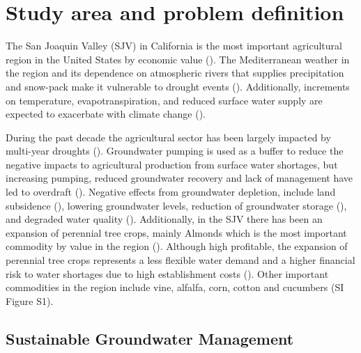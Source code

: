 \documentclass[11pt,a4paper]{article}
\begin{document}
\section{Study area and problem definition}

The San Joaquin Valley (SJV) in California is the most important agricultural region in the United States by economic value (\cite{usda_national_2020}). The Mediterranean weather in the region and its dependence on atmospheric rivers that supplies precipitation and snow-pack make it vulnerable to drought events (\cite{espinoza_global_2018}). Additionally, increments on temperature, evapotranspiration, and reduced surface water supply are expected to exacerbate with climate change (\cite{fernandez-bou_regional_2021}).

During the past decade the agricultural sector has been largely impacted by multi-year droughts (\cite{lund_lessons_2018,medellin-azuara_economic_2022}). Groundwater pumping is used as a buffer to reduce the negative impacts to agricultural production from surface water shortages, but increasing pumping, reduced groundwater recovery and lack of management have led to overdraft  (\cite{liu_groundwater_2022}). Negative effects from groundwater depletion, include land subsidence (\cite{ojha_sustained_2018}), lowering groundwater levels, reduction of groundwater storage (\cite{alam_post-drought_2021}), and degraded water quality (\cite{levy_critical_2021}). Additionally, in the SJV there has been an expansion of perennial tree crops, mainly Almonds which is the most important commodity by value  in the region (\cite{usda_national_2020}). Although high profitable, the expansion of perennial tree crops represents a less flexible water demand and a higher financial risk to water shortages due to high establishment costs (\cite{qin_flexibility_2019,mall_water_2019}). Other important commodities in the region include vine, alfalfa, corn, cotton and cucumbers (SI Figure S1). 

\subsection{Sustainable Groundwater Management}
\end{document}
